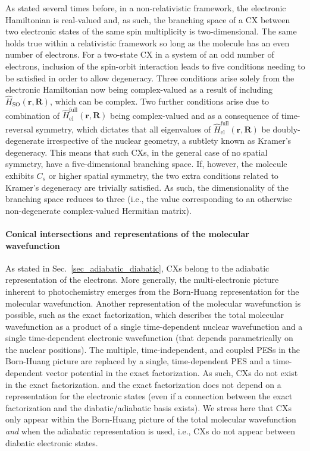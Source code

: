 \documentclass[9pt,bestpractices]{livecoms}
\newcommand{\R}{\mathbf{R}}
\newcommand{\re}{\mathbf{r}}
\begin{document}
As stated several times before, in a non-relativistic framework, the electronic Hamiltonian is real-valued and, as such, the branching space of a CX between two electronic states of the same spin multiplicity is two-dimensional.
The same holds true within a relativistic framework so long as the molecule has an even number of electrons.
For a two-state CX in a system of an odd number of electrons, inclusion of the spin-orbit interaction leads to five conditions needing to be satisfied in order to allow degeneracy.\cite{matsika2001effects1, matsika2001effects2, matsika2002spin, han2003properties}
Three conditions arise solely from the electronic Hamiltonian now being complex-valued as a result of including $\hat{H}_{\text{SO}}(\re,\R)$, which can be complex.\cite{mead1979noncrossing}
Two further conditions arise due to combination of $\hat{H}_{\text{el}}^\text{full}(\re,\R)$ being complex-valued and as a consequence of time-reversal symmetry, which dictates that all eigenvalues of $\hat{H}_{\text{el}}^\text{full}(\re,\R)$ be doubly-degenerate irrespective of the nuclear geometry, a subtlety known as Kramer’s degeneracy.\cite{kramers1930theorie}
This means that such CXs, in the general case of no spatial symmetry, have a five-dimensional branching space.
If, however, the molecule exhibits $C_s$ or higher spatial symmetry, the two extra conditions related to Kramer’s degeneracy are trivially satisfied.
As such, the dimensionality of the branching space reduces to three (i.e., the value corresponding to an otherwise non-degenerate complex-valued Hermitian matrix).\cite{matsika2001effects1}

\paragraph{Conical intersections and representations of the molecular wavefunction}
As stated in Sec.~\ref{sec_adiabatic_diabatic}, CXs belong to the adiabatic representation of the electrons. More generally, the multi-electronic picture inherent to photochemistry emerges from the Born-Huang representation for the molecular wavefunction. Another representation of the molecular wavefunction is possible, such as the exact factorization, which describes the total molecular wavefunction as a product of a single time-dependent nuclear wavefunction and a single time-dependent electronic wavefunction (that depends parametrically on the nuclear positions).\cite{abedi_exact_2010,abedi_correlated_2012} The multiple, time-independent, and coupled PESs in the Born-Huang picture are replaced by a single, time-dependent PES and a time-dependent vector potential in the exact factorization.\cite{abedisteps} As such, CXs do not exist in the exact factorization.\cite{curchod_dynamics_2017,agostini_when_2018} and the exact factorization does not depend on a representation for the electronic states (even if a connection between the exact factorization and the diabatic/adiabatic basis exists\cite{schurger2025efbh}). We stress here that CXs only appear within the Born-Huang picture of the total molecular wavefunction \textit{and} when the adiabatic representation is used, i.e., CXs do not appear between diabatic electronic states.
\end{document}
